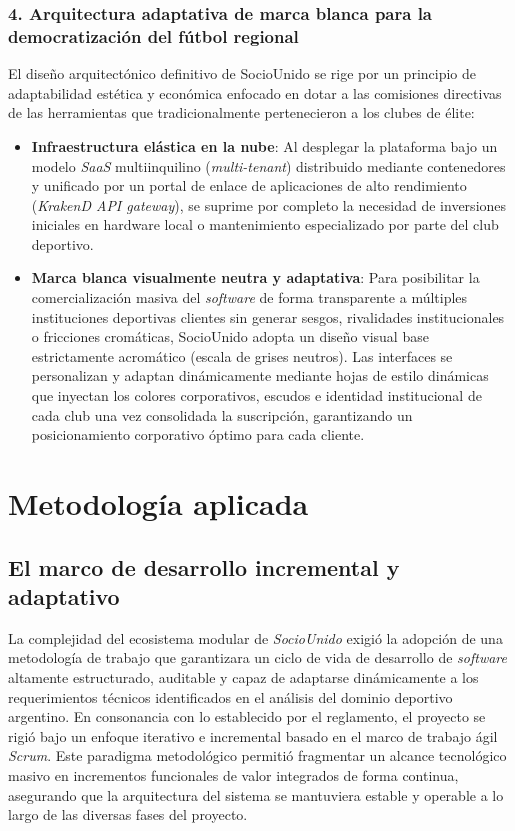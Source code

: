 \documentclass[conference, a4paper]{IEEEtran}
\begin{document}
\subsubsection{4. Arquitectura adaptativa de marca blanca para la democratizaci\'on del f\'utbol regional}
El dise\~no arquitect\'onico definitivo de SocioUnido se rige por un principio de adaptabilidad est\'etica y econ\'omica enfocado en dotar a las comisiones directivas de las herramientas que tradicionalmente pertenecieron a los clubes de \'elite:

\begin{itemize}
    \item \textbf{Infraestructura el\'astica en la nube}: Al desplegar la plataforma bajo un modelo \textit{SaaS} multiinquilino (\textit{multi-tenant}) distribuido mediante contenedores y unificado por un portal de enlace de aplicaciones de alto rendimiento (\textit{KrakenD API gateway}), se suprime por completo la necesidad de inversiones iniciales en hardware local o mantenimiento especializado por parte del club deportivo.
    \item \textbf{Marca blanca visualmente neutra y adaptativa}: Para posibilitar la comercializaci\'on masiva del \textit{software} de forma transparente a m\'ultiples instituciones deportivas clientes sin generar sesgos, rivalidades institucionales o fricciones crom\'aticas, SocioUnido adopta un dise\~no visual base estrictamente acrom\'atico (escala de grises neutros). Las interfaces se personalizan y adaptan din\'amicamente mediante hojas de estilo din\'amicas que inyectan los colores corporativos, escudos e identidad institucional de cada club una vez consolidada la suscripci\'on, garantizando un posicionamiento corporativo \'optimo para cada cliente. 
\end{itemize}

\section{Metodolog\'ia aplicada}

\subsection{El marco de desarrollo incremental y adaptativo}
La complejidad del ecosistema modular de \textit{SocioUnido} exigi\'o la adopci\'on de una metodolog\'ia de trabajo que garantizara un ciclo de vida de desarrollo de \textit{software} altamente estructurado, auditable y capaz de adaptarse din\'amicamente a los requerimientos t\'ecnicos identificados en el an\'alisis del dominio deportivo argentino. En consonancia con lo establecido por el reglamento, el proyecto se rigi\'o bajo un enfoque iterativo e incremental basado en el marco de trabajo \'agil \textit{Scrum}. Este paradigma metodol\'ogico permiti\'o fragmentar un alcance tecnol\'ogico masivo en incrementos funcionales de valor integrados de forma continua, asegurando que la arquitectura del sistema se mantuviera estable y operable a lo largo de las diversas fases del proyecto.
\end{document}
